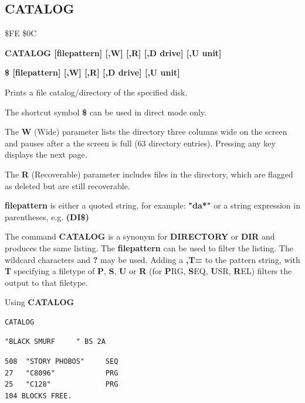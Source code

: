 \subsection{CATALOG}
\begin{description}[leftmargin=2cm,style=nextline]
\item [Token:]  \$FE \$0C
\item [Format:] {\bf CATALOG [filepattern] [,W] [,R] [,D drive] [,U unit] }
\item [Format:] {\bf \$ [filepattern] [,W] [,R] [,D drive] [,U unit] }
\item [Usage:]  Prints a file catalog/directory of the specified disk.

   The shortcut symbol {\bf \$} can be used in direct mode only.

   The {\bf W} (Wide) parameter lists the directory three columns wide
   on the screen and pauses after a the screen is full (63 directory
   entries). Pressing any key displays the next page.

   The {\bf R} (Recoverable) parameter includes files in the
   directory, which are flagged as deleted but are still
   recoverable.

   {\bf filepattern} is either a quoted string, for example: {\bf "da*"} or
   a string expression in parentheses, e.g. {\bf (DI\$)}

   \drivedefinition

   \unitdefinition

\item [Remarks:]
   The command {\bf CATALOG} is a synonym for {\bf DIRECTORY}
   or {\bf DIR} and produces the same listing.
   The {\bf filepattern} can be used to filter the listing.
   The wildcard characters {\bf *} and {\bf ?} may be used.
   Adding a {\bf ,T=} to the pattern string, with {\bf T} specifying
   a filetype of {\bf P}, {\bf S}, {\bf U} or {\bf R}
   (for {\bf P}RG, {\bf S}EQ, {\bf U}SR, {\bf R}EL) filters the
   output to that filetype.

\item [Example:] Using {\bf CATALOG}

\begin{tcolorbox}[colback=black,coltext=white]
\verbatimfont{\codefont}
\begin{verbatim}
CATALOG
\end{verbatim}
\selectfont{\codefont 0}
\begin{tcolorbox}[colback=white,coltext=black,arc=0mm,boxrule=0mm,
       left*=0.5mm,right*=0mm,top=0mm,bottom=0mm,nobeforeafter,
       left skip=0.5mm,
       width=28mm,height=3mm,valign=center]
\begin{verbatim}
"BLACK SMURF     " BS 2A
\end{verbatim}
\end{tcolorbox}
\begin{verbatim}
508  "STORY PHOBOS"     SEQ
27   "C8096"            PRG
25   "C128"             PRG
104 BLOCKS FREE.
\end{verbatim}
\end{tcolorbox}


\end{description}
